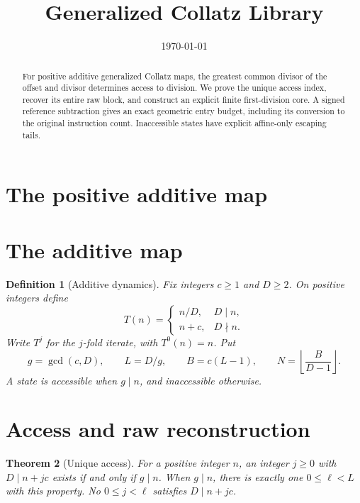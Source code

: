 \documentclass[11pt,letterpaper]{article}
\title{Generalized Collatz Library}
\author{}
\date{\today}
\newtheorem{theorem}{Theorem}
\newtheorem{definition}[theorem]{Definition}
\begin{document}
\maketitle
\section*{The positive additive map}

\begin{abstract}
For positive additive generalized Collatz maps, the greatest common divisor
of the offset and divisor determines access to division. We prove the unique
access index, recover its entire raw block, and construct an explicit finite
first-division core. A signed reference subtraction gives an exact geometric
entry budget, including its conversion to the original instruction count.
Inaccessible states have explicit affine-only escaping tails.
\end{abstract}

\section{The additive map}

\begin{definition}[Additive dynamics]
Fix integers \(c\geq1\) and \(D\geq2\). On positive integers define
\[
 T(n)=\begin{cases}n/D,&D\mid n,\\ n+c,&D\nmid n.\end{cases}
\]
Write \(T^j\) for the \(j\)-fold iterate, with \(T^0(n)=n\). Put
\[
 g=\gcd(c,D),\qquad L=D/g,\qquad
 B=c(L-1),\qquad N=\left\lfloor\frac{B}{D-1}\right\rfloor.
\]
A state is accessible when \(g\mid n\), and inaccessible otherwise.
\end{definition}

\section{Access and raw reconstruction}

\begin{theorem}[Unique access]
For a positive integer \(n\), an integer \(j\geq0\) with \(D\mid n+jc\)
exists if and only if \(g\mid n\). When \(g\mid n\), there is exactly one
\(0\leq\ell<L\) with this property. No \(0\leq j<\ell\) satisfies
\(D\mid n+jc\).
\end{theorem}
\end{document}
